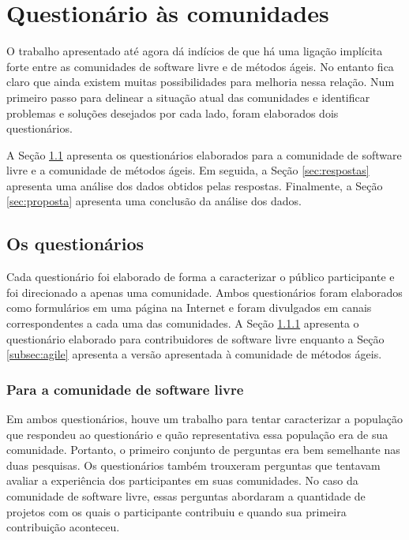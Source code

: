 \chapter{Questionário às comunidades}
\label{cap:pesquisas}

O trabalho apresentado até agora dá indícios de que há uma ligação
implícita forte entre as comunidades de software livre e de métodos
ágeis. No entanto fica claro que ainda existem muitas possibilidades
para melhoria nessa relação. Num primeiro passo para delinear a
situação atual das comunidades e identificar problemas e soluções
desejados por cada lado, foram elaborados dois questionários.

A Seção \ref{sec:questionarios} apresenta os questionários elaborados
para a comunidade de software livre e a comunidade de métodos
ágeis. Em seguida, a Seção \ref{sec:respostas} apresenta uma análise
dos dados obtidos pelas respostas. Finalmente, a Seção
\ref{sec:proposta} apresenta uma conclusão da análise dos dados.

\section{Os questionários}
\label{sec:questionarios}

Cada questionário foi elaborado de forma a caracterizar o público
participante e foi direcionado a apenas uma comunidade. Ambos
questionários foram elaborados como formulários em uma página na
Internet e foram divulgados em canais correspondentes a cada uma das
comunidades. A Seção \ref{subsec:floss} apresenta o questionário
elaborado para contribuidores de software livre enquanto a Seção
\ref{subsec:agile} apresenta a versão apresentada à comunidade de
métodos ágeis.

\subsection{Para a comunidade de software livre}
\label{subsec:floss}

Em ambos questionários, houve um trabalho para tentar caracterizar a
população que respondeu ao questionário e quão representativa essa
população era de sua comunidade. Portanto, o primeiro conjunto de
perguntas era bem semelhante nas duas pesquisas. Os questionários
também trouxeram perguntas que tentavam avaliar a experiência dos
participantes em suas comunidades. No caso da comunidade de software
livre, essas perguntas abordaram a quantidade de projetos com os quais
o participante contribuiu e quando sua primeira contribuição
aconteceu.

